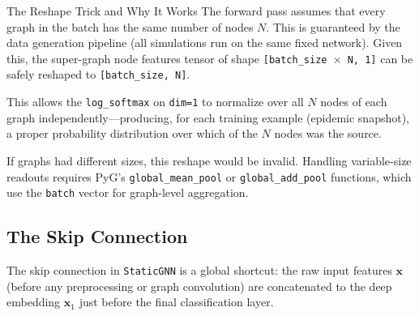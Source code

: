 \begin{keyinsight}{The Reshape Trick and Why It Works}
The forward pass assumes that every graph in the batch has the same number of nodes $N$. This is guaranteed by the data generation pipeline (all simulations run on the same fixed network). Given this, the super-graph node features tensor of shape \texttt{[batch\_size $\times$ N, 1]} can be safely reshaped to \texttt{[batch\_size, N]}.

This allows the \texttt{log\_softmax} on \texttt{dim=1} to normalize over all $N$ nodes of each graph independently---producing, for each training example (epidemic snapshot), a proper probability distribution over which of the $N$ nodes was the source.

If graphs had different sizes, this reshape would be invalid. Handling variable-size readouts requires PyG's \texttt{global\_mean\_pool} or \texttt{global\_add\_pool} functions, which use the \texttt{batch} vector for graph-level aggregation.
\end{keyinsight}

\subsection{The Skip Connection}

The skip connection in \texttt{StaticGNN} is a global shortcut: the raw input features $\mathbf{x}$ (before any preprocessing or graph convolution) are concatenated to the deep embedding $\mathbf{x}_1$ just before the final classification layer.

\begin{center}
\end{center}

